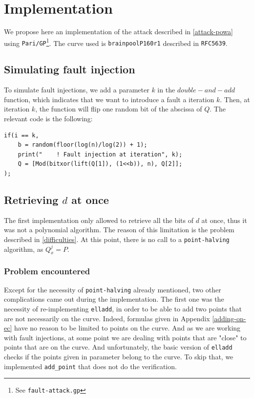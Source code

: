 \documentclass[journal]{IEEEtran}
\begin{document}
\section{Implementation}
\label{implem}
We propose here an implementation of the attack described in \ref{attack-powa} using {\tt Pari/GP}\footnote{See {\tt fault-attack.gp}}. The curve used is {\tt brainpoolP160r1} described in {\tt RFC5639}.

\subsection{Simulating fault injection}
To simulate fault injections, we add a parameter $k$ in the $double-and-add$ function, which indicates that we want to introduce a fault a iteration $k$. Then, at iteration $k$, the function will flip one random bit of
the abscissa of $Q$. The relevant code is the following: 

\begin{footnotesize}
\begin{verbatim}
if(i == k,
    b = random(floor(log(n)/log(2)) + 1);
    print("    ! Fault injection at iteration", k);
    Q = [Mod(bitxor(lift(Q[1]), (1<<b)), n), Q[2]];
);
\end{verbatim}
\end{footnotesize}

\subsection{Retrieving $d$ at once}
The first implementation only allowed to retrieve all the bits of $d$ at once, thus it was not a polynomial algorithm. The reason of this limitation is the problem described in \ref{difficulties}.
At this point, there is no call to a {\tt point-halving} algorithm, as $Q_x^{j} = P$.\\

\subsubsection{Problem encountered}
Except for the necessity of {\tt point-halving} already mentioned, two other complications came out during the implementation. The first one was the necessity of re-implementing {\tt elladd}, in 
order to be able to add two points that are not necessarily on the curve. Indeed, formulas given in Appendix \ref{adding-on-ec} have no reason to be limited to points on the curve. And as we are working with 
fault injections, at some point we are dealing with points that are "close" to points that are on the curve. And unfortunately, the basic version of {\tt elladd} checks if the points given in parameter belong to the curve.
To skip that, we implemented {\tt add\_point} that does not do the verification.\\ 
\end{document}
